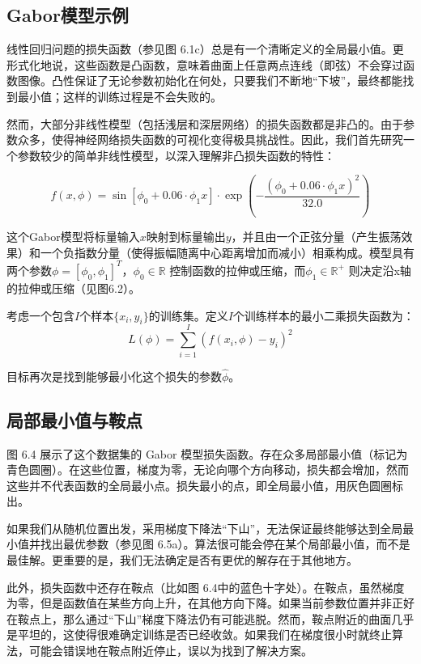\subsection{Gabor模型示例}
线性回归问题的损失函数（参见图 6.1c）总是有一个清晰定义的全局最小值。更形式化地说，这些函数是凸函数，意味着曲面上任意两点连线（即弦）不会穿过函数图像。凸性保证了无论参数初始化在何处，只要我们不断地“下坡”，最终都能找到最小值；这样的训练过程是不会失败的。

然而，大部分非线性模型（包括浅层和深层网络）的损失函数都是非凸的。由于参数众多，使得神经网络损失函数的可视化变得极具挑战性。因此，我们首先研究一个参数较少的简单非线性模型，以深入理解非凸损失函数的特性：

\begin{equation}
f(x, \phi) = \sin[\phi_0 + 0.06 \cdot \phi_1x] \cdot \exp \left( - \frac{(\phi_0 + 0.06 \cdot \phi_1x)^2}{32.0} \right) 
\end{equation}

这个Gabor模型将标量输入\(x\)映射到标量输出\(y\)，并且由一个正弦分量（产生振荡效果）和一个负指数分量（使得振幅随离中心距离增加而减小）相乘构成。模型具有两个参数\(\phi = [\phi_0, \phi_1]^T\)，\(\phi_0 \in \mathbb{R}\) 控制函数的拉伸或压缩，而\(\phi_1 \in \mathbb{R}^+\) 则决定沿x轴的拉伸或压缩（见图6.2）。

考虑一个包含\(I\)个样本\(\{x_i, y_i\}\)的训练集。定义\(I\)个训练样本的最小二乘损失函数为：
\begin{equation}
L(\phi) = \sum_{i=1}^I (f(x_i, \phi) - y_i)^2 
\end{equation}

目标再次是找到能够最小化这个损失的参数\(\hat{\phi}\)。

\subsection{局部最小值与鞍点}
图 6.4 展示了这个数据集的 Gabor 模型损失函数。存在众多局部最小值（标记为青色圆圈）。在这些位置，梯度为零，无论向哪个方向移动，损失都会增加，然而这些并不代表函数的全局最小点。损失最小的点，即全局最小值，用灰色圆圈标出。

如果我们从随机位置出发，采用梯度下降法“下山”，无法保证最终能够达到全局最小值并找出最优参数（参见图 6.5a）。算法很可能会停在某个局部最小值，而不是最佳解。更重要的是，我们无法确定是否有更优的解存在于其他地方。

此外，损失函数中还存在鞍点（比如图 6.4中的蓝色十字处）。在鞍点，虽然梯度为零，但是函数值在某些方向上升，在其他方向下降。如果当前参数位置并非正好在鞍点上，那么通过“下山”梯度下降法仍有可能逃脱。然而，鞍点附近的曲面几乎是平坦的，这使得很难确定训练是否已经收敛。如果我们在梯度很小时就终止算法，可能会错误地在鞍点附近停止，误以为找到了解决方案。

